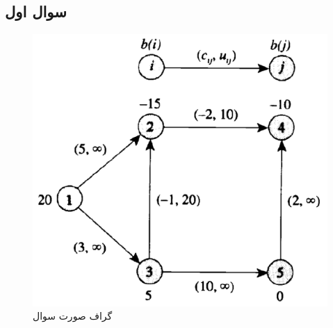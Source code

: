 \documentclass{article}
\begin{document}
\begin{multicols}{2}


\section*{سوال اول}

\begin{figure}[H]
    \center
    \includegraphics[width=0.9\linewidth]{Photos/HW2/1.png}
    \caption{
    گراف صورت سوال
    }
    \label{fig:my_label}
\end{figure}

\subsection*{}

\subsubsection*{
}


\end{multicols}
\end{document}
